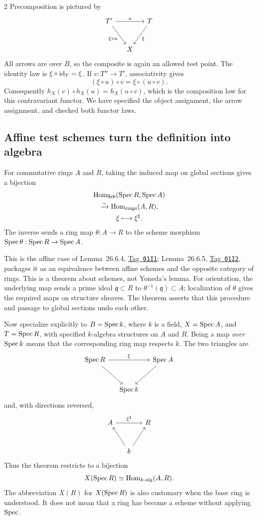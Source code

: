 \documentclass[12pt]{memoir}
\newcommand{\BGtag}[1]{\href{https://stacks.math.columbia.edu/tag/#1}{Tag~\texttt{#1}}}
\begin{document}
\begin{multicols}{2}
Precomposition is pictured by
\[
\begin{tikzcd}[column sep=small,row sep=large]
T' \arrow[rr,"u"] \arrow[dr,"\xi\circ u"'] &&T \arrow[dl,"\xi"]\\
&X&
\end{tikzcd}
\]
All arrows are over $B$, so the composite is again an allowed test
point. The identity law is $\xi\circ\operatorname{id}_T=\xi$. If
$v:T''\to T'$, associativity gives
\[
 (\xi\circ u)\circ v=\xi\circ(u\circ v).
\]
Consequently
$h_X(v)\circ h_X(u)=h_X(u\circ v)$, which is the composition law
for this contravariant functor. We have specified the object assignment,
the arrow assignment, and checked both functor laws.

\subsection{Affine test schemes turn the definition into algebra}
\begin{Th}\label{th:affinepoints}
For commutative rings $A$ and $R$, taking the induced map on global
sections gives a bijection
\[
\begin{gathered}
 \operatorname{Hom}_{\mathsf{Sch}}(\operatorname{Spec} R,\operatorname{Spec} A)\\
 \xrightarrow{\sim}\operatorname{Hom}_{\mathrm{rings}}(A,R),\\
 \xi\longmapsto\xi^\sharp.
\end{gathered}
\]
The inverse sends a ring map $\theta:A\to R$ to the scheme morphism
$\operatorname{Spec}\theta:\operatorname{Spec} R\to\operatorname{Spec} A$.
\end{Th}
This is the affine case of Lemma~26.6.4, \BGtag{01I1};
Lemma~26.6.5, \BGtag{01I2}, packages it as an equivalence between
affine schemes and the opposite category of rings. This is a theorem
about schemes, not Yoneda's lemma. For orientation, the underlying
map sends a prime ideal $\mathfrak q\subset R$ to
$\theta^{-1}(\mathfrak q)\subset A$; localization of $\theta$ gives
the required maps on structure sheaves. The theorem asserts that this
procedure and passage to global sections undo each other.

Now specialize explicitly to $B=\operatorname{Spec} k$, where $k$ is a field,
$X=\operatorname{Spec} A$, and $T=\operatorname{Spec} R$, with specified $k$-algebra structures
on $A$ and $R$. Being a map \emph{over $\operatorname{Spec} k$} means that the
corresponding ring map respects $k$. The two triangles are
\[
\begin{tikzcd}[column sep=small,row sep=large]
\Spec R \arrow[rr,"\xi"] \arrow[dr] &&\Spec A \arrow[dl]\\
&\Spec k&
\end{tikzcd}
\]
and, with directions reversed,
\[
\begin{tikzcd}[column sep=small,row sep=large]
A \arrow[rr,"\xi^\sharp"] &&R\\
&k \arrow[ul] \arrow[ur]&
\end{tikzcd}
\]
Thus the theorem restricts to a bijection
\[
 X(\operatorname{Spec} R)\simeq\operatorname{Hom}_{k\text{-alg}}(A,R).
\]
The abbreviation $X(R)$ for $X(\operatorname{Spec} R)$ is also customary when the
base ring is understood. It does not mean that a ring has become a
scheme without applying $\operatorname{Spec}$.


\end{multicols}
\end{document}

